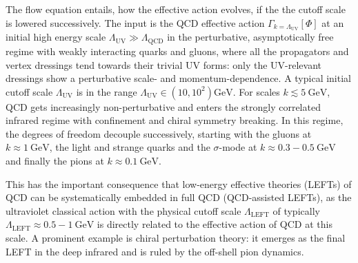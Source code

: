 \documentclass[aps,twocolumn,prd,superscriptaddress]{revtex4-2}
\begin{document}
The flow equation entails, how the effective action evolves, if the the cutoff scale is lowered successively. The input is the QCD effective action $\Gamma_{k=\Lambda_\textrm{UV}}[\Phi]$ at an initial high energy scale $\Lambda_\textrm{UV} \gg \Lambda_\textrm{QCD}$ in the perturbative, asymptotically free regime with weakly interacting quarks and gluons, where all the propagators and vertex dressings tend towards their trivial UV forms: only the UV-relevant dressings show a perturbative scale- and momentum-dependence. A typical initial cutoff scale $\Lambda_\textrm{UV}$ is in the range $\Lambda_\textrm{UV} \in (10, 10^2)\unit{\GeV}$. For scales $k\lesssim \qty{5}{\GeV}$, QCD gets increasingly non-perturbative and enters the strongly correlated infrared regime with confinement and chiral symmetry breaking. In this regime, the degrees of freedom decouple successively, starting with the gluons at $ k\approx \qty{1}{\GeV}$, the light and strange quarks and the $\sigma$-mode at $ k\approx 0.3-\qty{0.5}{\GeV}$ and finally the pions at $ k\approx \qty{0.1}{\GeV}$. 

This has the important consequence that low-energy effective theories (LEFTs) of QCD can be systematically embedded in full QCD (QCD-assisted LEFTs), as the ultraviolet classical action with the physical cutoff scale $\Lambda_\textrm{LEFT}$ of typically $\Lambda_\textrm{LEFT}\approx 0.5 - \qty{1}{\GeV}$ is directly related to the effective action of QCD at this scale. A prominent example is chiral perturbation theory: it emerges as the final LEFT in the deep infrared and is ruled by the off-shell pion dynamics. 
\end{document}
